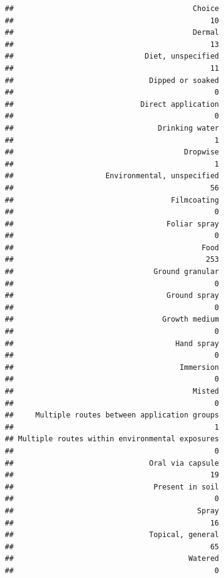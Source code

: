 \documentclass[
  12pt,
]{article}
\begin{document}
\begin{verbatim}
##                                         Choice 
##                                             10 
##                                         Dermal 
##                                             13 
##                              Diet, unspecified 
##                                             11 
##                               Dipped or soaked 
##                                              0 
##                             Direct application 
##                                              0 
##                                 Drinking water 
##                                              1 
##                                       Dropwise 
##                                              1 
##                     Environmental, unspecified 
##                                             56 
##                                    Filmcoating 
##                                              0 
##                                   Foliar spray 
##                                              0 
##                                           Food 
##                                            253 
##                                Ground granular 
##                                              0 
##                                   Ground spray 
##                                              0 
##                                  Growth medium 
##                                              0 
##                                     Hand spray 
##                                              0 
##                                      Immersion 
##                                              0 
##                                         Misted 
##                                              0 
##     Multiple routes between application groups 
##                                              1 
## Multiple routes within environmental exposures 
##                                              0 
##                               Oral via capsule 
##                                             19 
##                                Present in soil 
##                                              0 
##                                          Spray 
##                                             16 
##                               Topical, general 
##                                             65 
##                                        Watered 
##                                              0
\end{verbatim}
\end{document}

